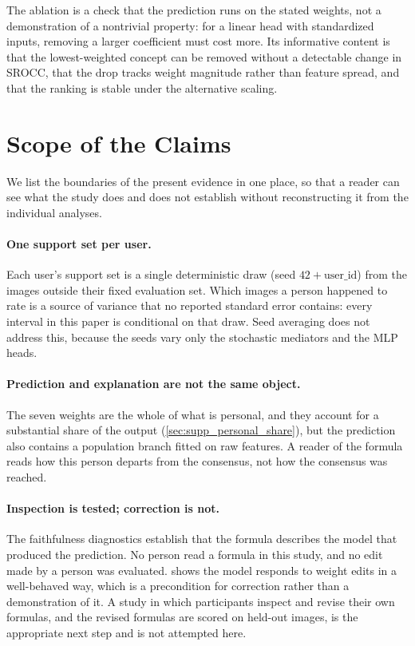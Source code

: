 The ablation is a check that the prediction runs on the stated weights, not a
demonstration of a nontrivial property: for a linear head with standardized
inputs, removing a larger coefficient must cost more. Its informative content
is that the lowest-weighted concept can be removed without a detectable change
in SROCC, that the drop tracks weight magnitude rather than feature spread, and
that the ranking is stable under the alternative scaling.


\section{Scope of the Claims}
\label{sec:supp_scope}

We list the boundaries of the present evidence in one place, so that a reader
can see what the study does and does not establish without reconstructing it
from the individual analyses.

\paragraph{One support set per user.}
Each user's support set is a single deterministic draw (seed
$42+\text{user\_id}$) from the images outside their fixed evaluation set. Which
images a person happened to rate is a source of variance that no reported
standard error contains: every interval in this paper is conditional on that
draw. Seed averaging does not address this, because the seeds vary only the
stochastic mediators and the MLP heads.

\paragraph{Prediction and explanation are not the same object.}
The seven weights are the whole of what is personal, and they account for a
substantial share of the output (\cref{sec:supp_personal_share}), but the
prediction also contains a population branch fitted on raw features. A reader
of the formula reads how this person departs from the consensus, not how the
consensus was reached.

\paragraph{Inspection is tested; correction is not.}
The faithfulness diagnostics establish that the formula describes the model
that produced the prediction. No person read a formula in this study, and no
edit made by a person was evaluated.  shows the
model responds to weight edits in a well-behaved way, which is a precondition
for correction rather than a demonstration of it. A study in which participants
inspect and revise their own formulas, and the revised formulas are scored on
held-out images, is the appropriate next step and is not attempted here.


